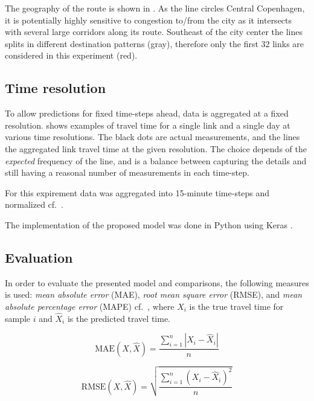 \documentclass[preprint,11pt,5p,twocolumn]{elsarticle}
\begin{document}
The geography of the route is shown in . As the line circles Central Copenhagen, it is potentially highly sensitive to congestion to/from the city as it intersects with several large corridors along its route. Southeast of the city center the lines splits in different destination patterns (gray), therefore only the first 32 links are considered in this experiment (red).

\subsection{Time resolution}
To allow predictions for fixed time-steps ahead, data is aggregated at a fixed resolution.  shows examples of travel time for a single link and a single day at various time resolutions. The black dots are actual measurements, and the lines the aggregated link travel time at the given resolution. The choice depends of the \emph{expected} frequency of the line, and is a balance between capturing the details and still having a reasonal number of measurements in each time-step.

For this expirement data was aggregated into 15-minute time-steps and normalized cf.~.



The implementation of the proposed model was done in Python using Keras \cite{Keras}.




\subsection{Evaluation}
In order to evaluate the presented model and comparisons, the following measures is used: \emph{mean absolute error} (MAE), \emph{root mean square error} (RMSE), and \emph{mean absolute percentage error} (MAPE) cf.~, where $X_i$ is the true travel time for sample $i$ and $\widehat{X}_i$ is the predicted travel time.

\begin{equation}
    \textrm{MAE}(X, \widehat{X}) = \frac{\sum_{i = 1}^{n} \left| X_i - \widehat{X}_i \right| }{n}
    \label{eq:mae}
\end{equation}

\begin{equation}
    \textrm{RMSE}(X, \widehat{X}) = \sqrt{\frac{\sum_{i = 1}^{n} \left(X_i - \widehat{X}_i \right)^2}{n}}
    \label{eq:rmse}
\end{equation}
\end{document}
